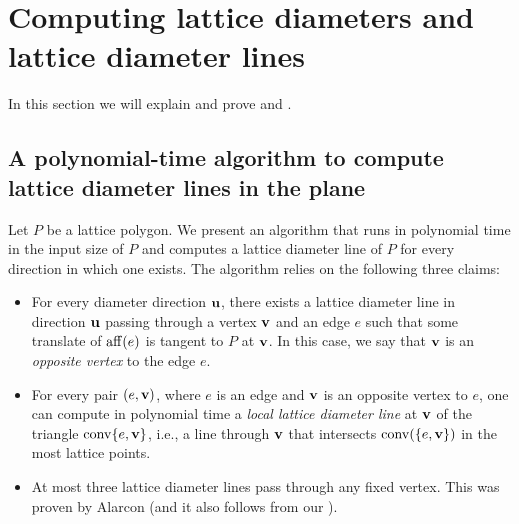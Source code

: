 \section{Computing lattice diameters and lattice diameter lines}\label{sec:LD-computation}

In this section we will explain and prove  and .

\subsection{A polynomial-time algorithm to compute lattice diameter lines in the plane}\label{sec:LD-poly}

Let $P$ be a lattice polygon. We present an algorithm that runs in polynomial time in the input size of $P$ and computes a lattice diameter line of $P$ for every direction in which one exists. 
The algorithm relies on the following three claims:
\begin{itemize}
    \item For every diameter direction $\mathbf{u}$, there exists a lattice diameter line in direction $\mathbf{u}$ passing through a vertex $\mathbf{v}$ and an edge $e$ such that some translate of $\operatorname{aff}(e)$ is tangent to $P$ at $\mathbf{v}$. In this case, we say that $\mathbf{v}$ is an \textit{opposite vertex} to the edge $e$. %
    \item For every pair $(e,\mathbf{v})$, where $e$ is an edge and $\mathbf{v}$ is an opposite vertex to $e$, one can compute in polynomial time a \textit{local lattice diameter line} at $\mathbf{v}$ of the triangle $\operatorname{conv} \{ e, \mathbf{v}\}$, i.e., a line through $\mathbf{v}$ that intersects $\operatorname{conv}(\{e,\mathbf{v}\})$ in the most lattice points.
    \item At most three lattice diameter lines pass through any fixed vertex. This was proven by Alarcon \cite[Lemma 2.4]{Alarcon_PhD} (and it also follows from our ).
\end{itemize}

